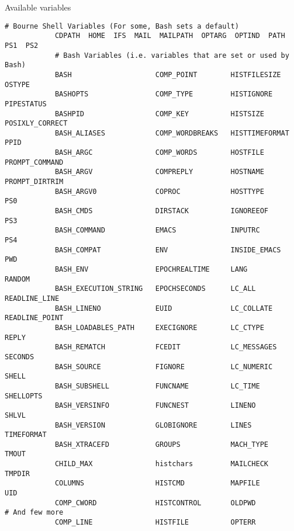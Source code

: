 \begin{frame}[fragile]{Available variables}{}
    \vspace{-5mm}
    \begin{center}
        \begin{lstlisting}[style=MyBash, numbers=none, basicstyle={\ttfamily\tiny\color{basic-color}}]
            # Bourne Shell Variables (For some, Bash sets a default)
            CDPATH  HOME  IFS  MAIL  MAILPATH  OPTARG  OPTIND  PATH  PS1  PS2
            # Bash Variables (i.e. variables that are set or used by Bash)
            BASH                    COMP_POINT        HISTFILESIZE     OSTYPE
            BASHOPTS                COMP_TYPE         HISTIGNORE       PIPESTATUS
            BASHPID                 COMP_KEY          HISTSIZE         POSIXLY_CORRECT
            BASH_ALIASES            COMP_WORDBREAKS   HISTTIMEFORMAT   PPID
            BASH_ARGC               COMP_WORDS        HOSTFILE         PROMPT_COMMAND
            BASH_ARGV               COMPREPLY         HOSTNAME         PROMPT_DIRTRIM
            BASH_ARGV0              COPROC            HOSTTYPE         PS0
            BASH_CMDS               DIRSTACK          IGNOREEOF        PS3
            BASH_COMMAND            EMACS             INPUTRC          PS4
            BASH_COMPAT             ENV               INSIDE_EMACS     PWD
            BASH_ENV                EPOCHREALTIME     LANG             RANDOM
            BASH_EXECUTION_STRING   EPOCHSECONDS      LC_ALL           READLINE_LINE
            BASH_LINENO             EUID              LC_COLLATE       READLINE_POINT
            BASH_LOADABLES_PATH     EXECIGNORE        LC_CTYPE         REPLY
            BASH_REMATCH            FCEDIT            LC_MESSAGES      SECONDS
            BASH_SOURCE             FIGNORE           LC_NUMERIC       SHELL
            BASH_SUBSHELL           FUNCNAME          LC_TIME          SHELLOPTS
            BASH_VERSINFO           FUNCNEST          LINENO           SHLVL
            BASH_VERSION            GLOBIGNORE        LINES            TIMEFORMAT
            BASH_XTRACEFD           GROUPS            MACH_TYPE        TMOUT
            CHILD_MAX               histchars         MAILCHECK        TMPDIR
            COLUMNS                 HISTCMD           MAPFILE          UID
            COMP_CWORD              HISTCONTROL       OLDPWD           # And few more
            COMP_LINE               HISTFILE          OPTERR
        \end{lstlisting}
    \end{center}
\end{frame}
